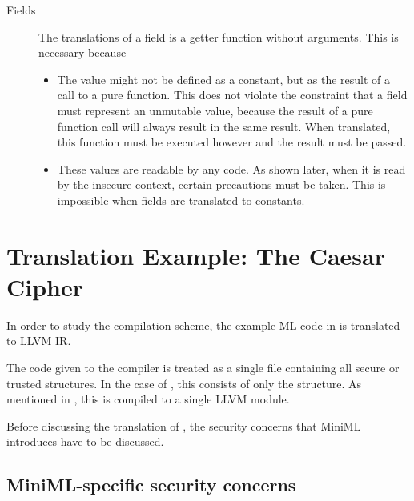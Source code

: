 \begin{description}

\item[Fields]
The translations of a field is a getter function without arguments.
This is necessary because \begin{itemize}
 \item The value might not be defined as a constant, but as the result of a call to a pure function.
 This does not violate the constraint that a field must represent an unmutable value, because the result of a pure function call will always result in the same result. 
When translated, this function must be executed however and the result must be passed.
\item These values are readable by any code.
As shown later, when it is read by the insecure context, certain precautions must be taken.
This is impossible when fields are translated to constants.
 \end{itemize}


\end{description}

\section{Translation Example: The Caesar Cipher}
In order to study the compilation scheme, the example ML code in  is translated to LLVM IR.

The code given to the compiler is treated as a single file containing all secure or trusted structures.
In the case of , this consists of only the  structure.
As mentioned in , this is compiled to a single LLVM module.

Before discussing the translation of , the security concerns that MiniML introduces have to be discussed.

\subsection{MiniML-specific security concerns}

